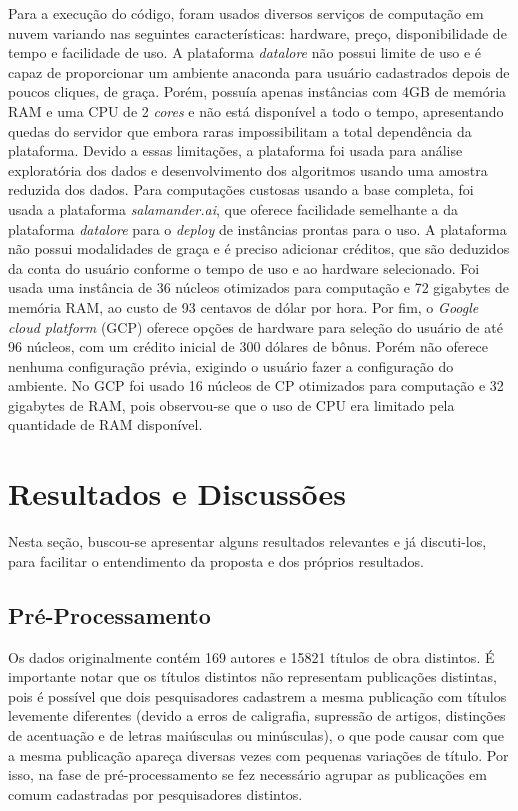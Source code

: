 \documentclass[12pt]{article}
\begin{document}
Para a execução do código, foram usados diversos serviços de computação em nuvem variando nas seguintes características: hardware, preço, disponibilidade de tempo e facilidade de uso. A plataforma \textit{datalore} não possui limite de uso e é capaz de proporcionar um ambiente anaconda para usuário cadastrados depois de poucos cliques, de graça. Porém, possuía apenas instâncias com 4GB de memória RAM e uma CPU de 2 \textit{cores} e não está disponível a todo o tempo, apresentando quedas do servidor que embora raras impossibilitam a total dependência da plataforma. Devido a essas limitações, a plataforma foi usada para análise exploratória dos dados e desenvolvimento dos algoritmos usando uma amostra reduzida dos dados. Para computações custosas usando a base completa, foi usada a plataforma \textit{salamander.ai}, que oferece facilidade semelhante a da plataforma \textit{datalore} para o \textit{deploy} de instâncias prontas para o uso. A plataforma não possui modalidades de graça e é preciso adicionar créditos, que são deduzidos da conta do usuário conforme o tempo de uso e ao hardware selecionado. Foi usada uma instância de 36 núcleos otimizados para computação e 72 gigabytes de memória RAM, ao custo de 93 centavos de dólar por hora. Por fim, o \textit{Google cloud platform} (GCP) oferece opções de hardware para seleção do usuário de até 96 núcleos, com um crédito inicial de 300 dólares de bônus. Porém não oferece nenhuma configuração prévia, exigindo o usuário fazer a configuração do ambiente. No GCP foi usado 16 núcleos de CP otimizados para computação e 32 gigabytes de RAM, pois observou-se que o uso de CPU era limitado pela quantidade de RAM disponível.

\section{Resultados e Discussões}

Nesta seção, buscou-se apresentar alguns resultados relevantes e já discuti-los, para facilitar o entendimento da proposta e dos próprios resultados.

\subsection{Pré-Processamento}

Os dados originalmente contém 169 autores e 15821 títulos de obra distintos. É importante notar que os títulos distintos não representam publicações distintas, pois é possível que dois pesquisadores cadastrem a mesma publicação com títulos levemente diferentes (devido a erros de caligrafia, supressão de artigos, distinções de acentuação e de letras maiúsculas ou minúsculas), o que pode causar com que a mesma publicação apareça diversas vezes com pequenas variações de título. Por isso, na fase de pré-processamento se fez necessário agrupar as publicações em comum cadastradas por pesquisadores distintos.
\end{document}
